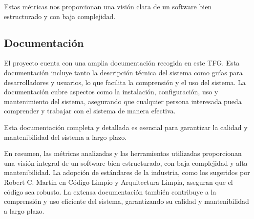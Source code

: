 Estas métricas nos proporcionan una visión clara de un software bien estructurado y con baja complejidad.

\subsection*{Documentación}

El proyecto cuenta con una amplia documentación recogida en este TFG.
Esta documentación incluye tanto la descripción técnica del sistema como guías para desarrolladores y usuarios, lo que
facilita la comprensión y el uso del sistema.
La documentación cubre aspectos como la instalación, configuración, uso y mantenimiento del sistema, asegurando que
cualquier persona interesada pueda comprender y trabajar con el sistema de manera efectiva.

Esta documentación completa y detallada es esencial para garantizar la calidad y mantenibilidad del sistema a largo
plazo.

En resumen, las métricas analizadas y las herramientas utilizadas proporcionan una visión integral de un software bien
estructurado, con baja complejidad y alta mantenibilidad.
La adopción de estándares de la industria, como los sugeridos por Robert C. Martin en Código Limpio y Arquitectura
Limpia, aseguran que el código sea robusto.
La extensa documentación también contribuye a la comprensión y uso eficiente del sistema, garantizando su calidad y
mantenibilidad a largo plazo.












